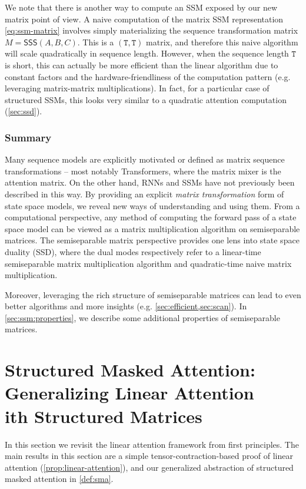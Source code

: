We note that there is another way to compute an SSM exposed by our new matrix point of view. A naive computation of the matrix SSM representation \eqref{eq:ssm-matrix} involves simply materializing the sequence transformation matrix $M=\mathsf{SSS}(A, B, C)$. This is a $\mathtt{(T,T)}$ matrix, and therefore this naive algorithm will scale quadratically in sequence length. However, when the sequence length $\mathtt{T}$ is short, this can actually be more efficient than the linear algorithm due to constant factors and the hardware-friendliness of the computation pattern (e.g. leveraging matrix-matrix multiplications). In fact, for a particular case of structured SSMs, this looks very similar to a quadratic attention computation (\ref{sec:ssd}).

\subsubsection{Summary}

Many sequence models are explicitly motivated or defined as matrix sequence transformations -- most notably Transformers, where the matrix mixer is the attention matrix. On the other hand, RNNs and SSMs have not previously been described in this way. By providing an explicit \emph{matrix transformation} form of state space models, we reveal new ways of understanding and using them. From a computational perspective, any method of computing the forward pass of a state space model can be viewed as a matrix multiplication algorithm on semiseparable matrices. The semiseparable matrix perspective provides one lens into state space duality (SSD), where the dual modes respectively refer to a linear-time semiseparable matrix multiplication algorithm and quadratic-time naive matrix multiplication.

Moreover, leveraging the rich structure of semiseparable matrices can lead to even better algorithms and more insights (e.g. \ref{sec:efficient,sec:scan}).
In \ref{sec:ssm:properties}, we describe some additional properties of semiseparable matrices.

\section{Structured Masked Attention: Generalizing Linear Attention \texorpdfstring{\\} with Structured Matrices}
\label{sec:attention}

In this section we revisit the linear attention framework from first principles. The main results in this section are a simple tensor-contraction-based proof of linear attention (\ref{prop:linear-attention}),
and our generalized abstraction of structured masked attention in \ref{def:sma}.

